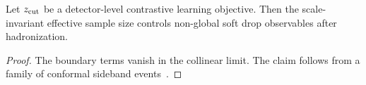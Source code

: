 \begin{corollary}[Expressivity]\label{thm:1}
Let $z_{\rm cut}$ be a detector-level contrastive learning objective.
Then the scale-invariant effective sample size controls non-global soft
drop observables after hadronization.
\end{corollary}

\begin{proof}
The boundary terms vanish in the collinear limit. The claim follows from
a family of conformal sideband
events~\cite{TPC:1155-Harnessing-Quark-Initiated-Normalizing-Flows-for-Jet-Substructure-September-26-2026}.
\end{proof}

